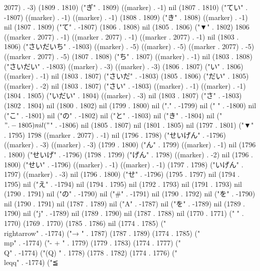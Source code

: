 2077) . -3) (1809 . 1810) ("ぎ" . 1809) ((marker) . -1) nil (1807 . 1810) ("てい" . -1807) ((marker) . -1) ((marker) . -1) (1808 . 1809) ("き" . 1808) ((marker) . -1) nil (1807 . 1809) ("て" . -1807) (1806 . 1808) nil (1805 . 1806) ("▼" . 1802) 1806 ((marker . 2077) . -1) ((marker . 2077) . -1) ((marker . 2077) . -1) nil (1803 . 1806) ("さいだいち" . -1803) ((marker) . -5) ((marker) . -5) ((marker . 2077) . -5) ((marker . 2077) . -5) (1807 . 1808) ("ち" . 1807) ((marker) . -1) nil (1803 . 1808) ("さいだい" . -1803) ((marker) . -3) ((marker) . -3) (1806 . 1807) ("い" . 1806) ((marker) . -1) nil (1803 . 1807) ("さいだ" . -1803) (1805 . 1806) ("だい" . 1805) ((marker) . -2) nil (1803 . 1807) ("さい" . -1803) ((marker) . -1) ((marker) . -1) (1804 . 1805) ("いだい" . 1804) ((marker) . -3) nil (1803 . 1807) ("さ" . -1803) (1802 . 1804) nil (1800 . 1802) nil (1799 . 1800) nil ("." . -1799) nil (" " . -1800) nil ("こ" . -1801) nil ("の" . -1802) nil ("と" . -1803) nil ("き" . -1804) nil ("$" . -1805) nil ("$" . -1806) nil (1805 . 1807) nil (1801 . 1805) nil (1797 . 1801) ("▼" . 1795) 1798 ((marker . 2077) . -1) nil (1796 . 1798) ("せいげん" . -1796) ((marker) . -3) ((marker) . -3) (1799 . 1800) ("ん" . 1799) ((marker) . -1) nil (1796 . 1800) ("せいげ" . -1796) (1798 . 1799) ("げん" . 1798) ((marker) . -2) nil (1796 . 1800) ("せい" . -1796) ((marker) . -1) ((marker) . -1) (1797 . 1798) ("いげん" . 1797) ((marker) . -3) nil (1796 . 1800) ("せ" . -1796) (1795 . 1797) nil (1794 . 1795) nil ("え" . -1794) nil (1794 . 1795) nil (1792 . 1793) nil (1791 . 1793) nil (1790 . 1791) nil ("の" . -1790) nil ("#" . -1791) nil (1790 . 1792) nil ("を" . -1790) nil (1790 . 1791) nil (1787 . 1789) nil ("A" . -1787) nil ("を" . -1789) nil (1789 . 1790) nil ("j" . -1789) nil (1789 . 1790) nil (1787 . 1788) nil (1770 . 1771) (" " . 1770) (1769 . 1770) (1785 . 1786) nil (1774 . 1785) ("\\rightarrow" . -1774) ("→
" . 1787) (1787 . 1789) (1774 . 1785) ("\\mp" . -1774) ("-
+
" . 1779) (1779 . 1783) (1774 . 1777) ("\\Q" . -1774) ("(Q)
" . 1778) (1778 . 1782) (1774 . 1776) ("\\leqq" . -1774) ("≦
